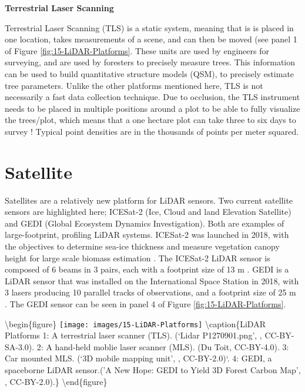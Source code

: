 \documentclass[
]{book}
\begin{document}
\textbf{Terrestrial Laser Scanning}

Terrestrial Laser Scanning (TLS) is a static system, meaning that is is placed in one location, takes measurements of a scene, and can then be moved (see panel 1 of Figure \ref{fig:15-LiDAR-Platforms}. These units are used by engineers for surveying, and are used by foresters to precisely measure trees. This information can be used to build quantitative structure models (QSM), to precisely estimate tree parameters. Unlike the other platforms mentioned here, TLS is not necessarily a fast data collection technique. Due to occlusion, the TLS instrument needs to be placed in multiple positions around a plot to be able to fully visualize the trees/plot, which means that a one hectare plot can take three to six days to survey \citep{wilkes_understanding_2015}! Typical point densities are in the thousands of points per meter squared.

\hypertarget{satellite}{%
\section{Satellite}\label{satellite}}

Satellites are a relatively new platform for LiDAR sensors. Two current satellite sensors are highlighted here; ICESat-2 (Ice, Cloud and land Elevation Satellite) and GEDI (Global Ecosystem Dynamics Investigation). Both are examples of large-footprint, profiling LiDAR systems. ICESat-2 was launched in 2018, with the objectives to determine sea-ice thickness and measure vegetation canopy height for large scale biomass estimation \citep{nasa_icesat-2_2021}. The ICESat-2 LiDAR sensor is composed of 6 beams in 3 pairs, each with a footprint size of 13 m \citep{nasa_icesat-2_2021}. GEDI is a LiDAR sensor that was installed on the International Space Station in 2018, with 3 lasers producing 10 parallel tracks of observations, and a footprint size of 25 m \citep{nasa_gedi_2021}. The GEDI sensor can be seen in panel 4 of Figure \ref{fig:15-LiDAR-Platforms}.

\textbackslash begin\{figure\}
\texttt{[image: images/15-LiDAR-Platforms]} \textbackslash caption\{LiDAR Platforms 1: A terrestrial laser scanner (TLS). (`Lidar P1270901.png', \citet{monniaux_lidar_2007}, CC-BY-SA-3.0). 2: A hand-held moblie laser scanner (MLS). (Du Toit, CC-BY-4.0). 3: Car mounted MLS. (`3D mobile mapping unit', \citet{oregon_department_of_transportation_3d_2016}, CC-BY-2.0)`. 4: GEDI, a spaceborne LiDAR sensor.('A New Hope: GEDI to Yield 3D Forest Carbon Map', \citet{neon_education_key_2014}, CC-BY-2.0).\}\label{fig:15-LiDAR-Platforms}
\textbackslash end\{figure\}
\end{document}
